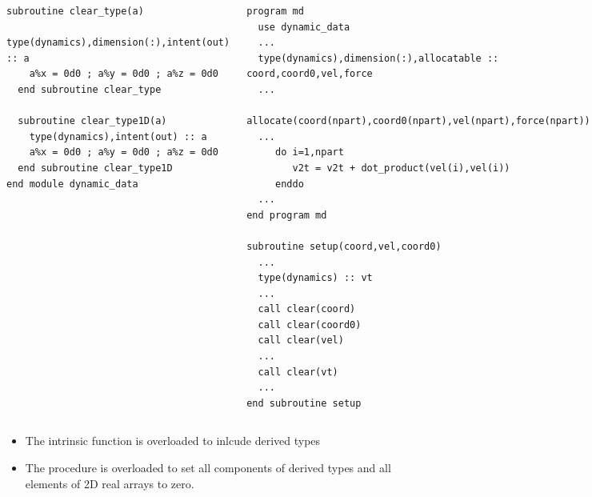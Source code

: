 \documentclass[10pt,t]{beamer}
\begin{document}
\begin{frame}
{\begin{columns}[t]
\begin{eblock}{}
\begin{lstlisting}[language={[90]Fortran},basicstyle=\fontsize{5}{6}\selectfont\ttfamily]
  subroutine clear_type(a)
    type(dynamics),dimension(:),intent(out) :: a
    a%x = 0d0 ; a%y = 0d0 ; a%z = 0d0
  end subroutine clear_type

  subroutine clear_type1D(a)
    type(dynamics),intent(out) :: a
    a%x = 0d0 ; a%y = 0d0 ; a%z = 0d0
  end subroutine clear_type1D
end module dynamic_data
        \end{lstlisting}
      \end{eblock}
      \column{6cm}
      \vspace{-0.5cm}
      \begin{eblock}{}
        \begin{lstlisting}[language={[90]Fortran},basicstyle=\fontsize{5}{6}\selectfont\ttfamily]
program md
  use dynamic_data
  ...
  type(dynamics),dimension(:),allocatable :: coord,coord0,vel,force
  ...
  allocate(coord(npart),coord0(npart),vel(npart),force(npart))
  ...
     do i=1,npart
        v2t = v2t + dot_product(vel(i),vel(i))
     enddo
  ...
end program md

subroutine setup(coord,vel,coord0)
  ...
  type(dynamics) :: vt
  ...
  call clear(coord)
  call clear(coord0)
  call clear(vel)
  ...
  call clear(vt)
  ...
end subroutine setup
        \end{lstlisting}
      \end{eblock}
    \end{columns}
  }
  \begin{itemize}
    \item The  intrinsic function is overloaded to inlcude derived types
    \item The procedure  is overloaded to set all components of derived types and all elements of 2D real arrays to zero. 
  \end{itemize}
\end{frame}
\end{document}
